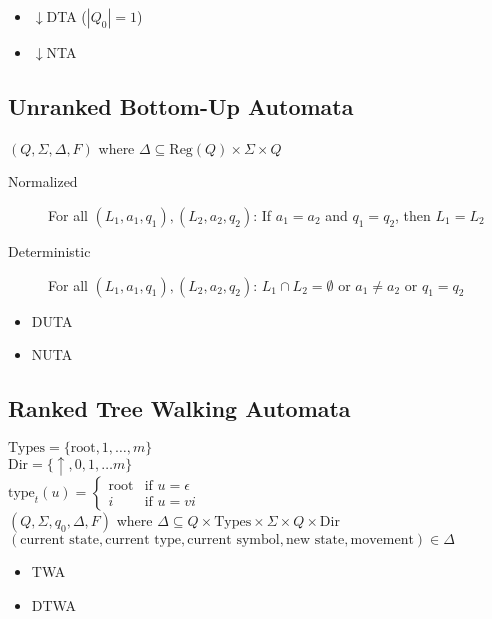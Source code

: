 \documentclass{article}
\begin{document}
\begin{itemize}
	\item $\downarrow$DTA ($|Q_0| = 1$)
	\item $\downarrow$NTA
\end{itemize}

\subsection{Unranked Bottom-Up Automata}
$(Q, \Sigma, \Delta, F)$ where $\Delta \subseteq \text{Reg}(Q) \times \Sigma \times Q$

\begin{description}
	\item[Normalized] For all $(L_1, a_1, q_1), (L_2, a_2, q_2)$: If $a_1 = a_2$ and $q_1 = q_2$, then $L_1 = L_2$
	\item[Deterministic] For all $(L_1, a_1, q_1), (L_2, a_2, q_2)$: $L_1 \cap L_2 = \emptyset$ or $a_1 \neq a_2$ or $q_1 = q_2$ 
\end{description}

\begin{itemize}
	\item DUTA
	\item NUTA
\end{itemize}

\subsection{Ranked Tree Walking Automata}
$\text{Types} = \{\text{root}, 1, \dots, m\}$ \\
$\text{Dir} = \{\uparrow, 0, 1, \dots m\}$ \\
$\text{type}_t(u) = \begin{cases}\text{root} & \text{if } u = \epsilon \\ i & \text{if } u = vi\end{cases}$ \vspace{10pt}
\\ 
$(Q, \Sigma, q_0, \Delta, F)$ where $\Delta \subseteq Q \times \text{Types} \times \Sigma \times Q \times \text{Dir}$ \\
$(\text{current state}, \text{current type}, \text{current symbol}, \text{new state}, \text{movement}) \in \Delta$

\begin{itemize}
	\item TWA
	\item DTWA
\end{itemize}
\end{document}
